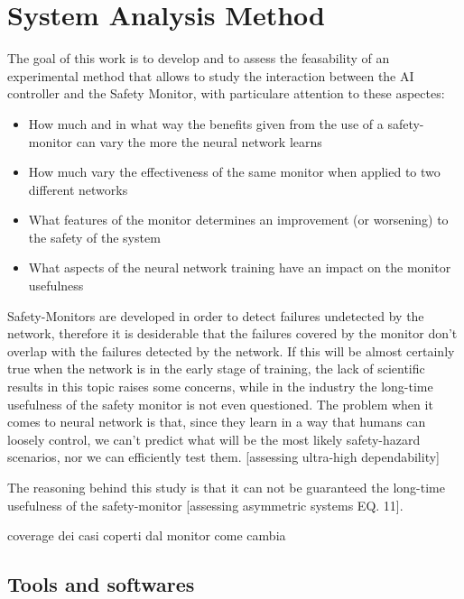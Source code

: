 \chapter{System Analysis Method}

The goal of this work is to develop and to assess the feasability of an experimental method that allows to study the interaction between the AI controller and the Safety Monitor, with particulare attention to these aspectes:

\begin{itemize}
	\item How much and in what way the benefits given from the use of a safety-monitor can vary the more the neural network learns
	\item How much vary the effectiveness of the same monitor when applied to two different networks
	\item What features of the monitor determines an improvement (or worsening) to the safety of the system
	\item What aspects of the neural network training have an impact on the monitor usefulness
\end{itemize}

Safety-Monitors are developed in order to detect failures undetected by the network, therefore it is desiderable that the failures covered by the monitor don't overlap with the failures detected by the network. If this will be almost certainly true when the network is in the early stage of training, the lack of scientific results in this topic raises some concerns, while in the industry the long-time usefulness of the safety monitor is not even questioned.\newline
The problem when it comes to neural network is that, since they learn in a way that humans can loosely control, we can't predict what will be the most likely safety-hazard scenarios, nor we can efficiently test them. [assessing ultra-high dependability]

The reasoning behind this study is that it can not be guaranteed the long-time usefulness of the safety-monitor [assessing asymmetric systems EQ. 11].\newline

coverage dei casi coperti dal monitor come cambia

\section{Tools and softwares}

